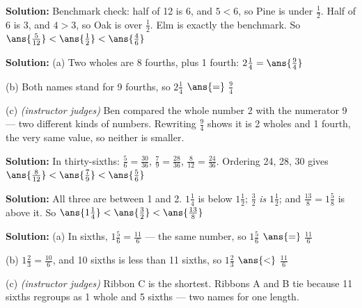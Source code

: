 \documentclass[12pt]{article}
\begin{document}
\textbf{Solution:} Benchmark check: half of 12 is 6, and $5 < 6$, so Pine is
under $\tfrac{1}{2}$. Half of 6 is 3, and $4 > 3$, so Oak is over
$\tfrac{1}{2}$. Elm is exactly the benchmark. So
$\ans{\tfrac{5}{12}} < \ans{\tfrac{1}{2}} < \ans{\tfrac{4}{6}}$


\textbf{Solution:} (a) Two wholes are 8 fourths, plus 1 fourth:
$2\tfrac{1}{4} = \ans{\tfrac{9}{4}}$

(b) Both names stand for 9 fourths, so
$2\tfrac{1}{4}$ $\ans{=}$ $\tfrac{9}{4}$

(c) \emph{(instructor judges)} Ben compared the whole number 2 with the
numerator 9 --- two different kinds of numbers. Rewriting $\tfrac{9}{4}$
shows it is 2 wholes and 1 fourth, the very same value, so neither is
smaller.


\textbf{Solution:} In thirty-sixths: $\tfrac{5}{6} = \tfrac{30}{36}$,
$\tfrac{7}{9} = \tfrac{28}{36}$, $\tfrac{8}{12} = \tfrac{24}{36}$. Ordering
24, 28, 30 gives
$\ans{\tfrac{8}{12}} < \ans{\tfrac{7}{9}} < \ans{\tfrac{5}{6}}$


\textbf{Solution:} All three are between 1 and 2. $1\tfrac{1}{4}$ is below
$1\tfrac{1}{2}$; $\tfrac{3}{2}$ \emph{is} $1\tfrac{1}{2}$; and
$\tfrac{13}{8} = 1\tfrac{5}{8}$ is above it. So
$\ans{1\tfrac{1}{4}} < \ans{\tfrac{3}{2}} < \ans{\tfrac{13}{8}}$


\textbf{Solution:} (a) In sixths, $1\tfrac{5}{6} = \tfrac{11}{6}$ --- the
same number, so $1\tfrac{5}{6}$ $\ans{=}$ $\tfrac{11}{6}$

(b) $1\tfrac{2}{3} = \tfrac{10}{6}$, and 10 sixths is less than 11 sixths,
so $1\tfrac{2}{3}$ $\ans{<}$ $\tfrac{11}{6}$

(c) \emph{(instructor judges)} Ribbon C is the shortest. Ribbons A and B tie
because 11 sixths regroups as 1 whole and 5 sixths --- two names for one
length.
\end{document}

